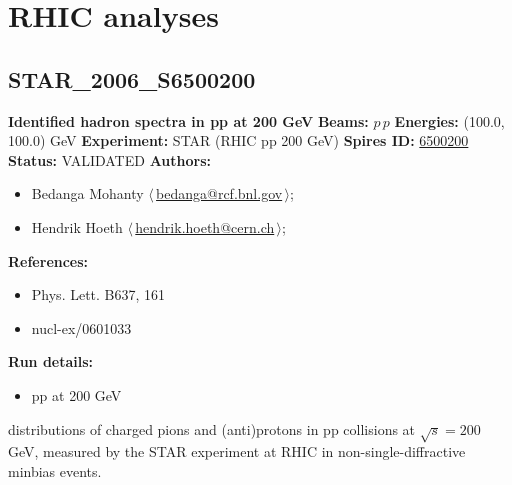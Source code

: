 \clearpage


\section{RHIC analyses}\subsection[STAR\_2006\_S6500200]{STAR\_2006\_S6500200\,\cite{Adams:2006nd}}
\textbf{Identified hadron spectra in pp at 200 GeV}\newline
\textbf{Beams:} $p$\,$p$ \newline
\textbf{Energies:} (100.0, 100.0) GeV \newline
\textbf{Experiment:} STAR (RHIC pp 200 GeV) \newline
\textbf{Spires ID:} \href{http://www.slac.stanford.edu/spires/find/hep/www?rawcmd=key+6500200}{6500200}\newline
\textbf{Status:} VALIDATED\newline
\textbf{Authors:}
\begin{itemize}
  \item Bedanga Mohanty $\langle\,$\href{mailto:bedanga@rcf.bnl.gov}{bedanga@rcf.bnl.gov}$\,\rangle$;
  \item Hendrik Hoeth $\langle\,$\href{mailto:hendrik.hoeth@cern.ch}{hendrik.hoeth@cern.ch}$\,\rangle$;
\end{itemize}
\textbf{References:}
\begin{itemize}
  \item Phys. Lett. B637, 161
  \item nucl-ex/0601033
\end{itemize}
\textbf{Run details:}
\begin{itemize}

  \item pp at 200 GeV\end{itemize}

\noindent \pT distributions of charged pions and (anti)protons in pp collisions at $\sqrt{s} = 200$ GeV, measured by the STAR experiment at RHIC in non-single-diffractive minbias events.

\clearpage


\clearpage

